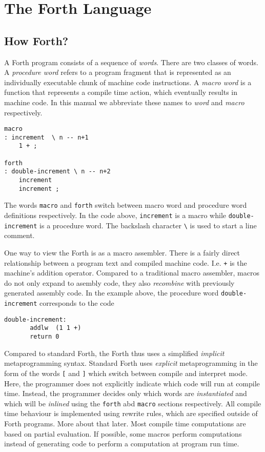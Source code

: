 \documentclass[12pt]{article}
\begin{document}
\section{The Forth Language}

\subsection{How Forth?}

A Forth program consists of a sequence of \emph{words}. There are two
classes of words. A \emph{procedure word} refers to a program fragment
that is represented as an individually executable chunk of machine
code instructions. A \emph{macro word} is a function that represents a
compile time action, which eventually results in machine code. In this
manual we abbreviate these names to \emph{word} and \emph{macro}
respectively.
\begin{verbatim}
macro
: increment  \ n -- n+1
    1 + ;

forth
: double-increment \ n -- n+2
    increment
    increment ;
\end{verbatim}
The words \verb|macro| and \verb|forth| switch between macro word and
procedure word definitions respectively. In the code above,
\verb|increment| is a macro while \verb|double-increment| is a
procedure word. The backslash character \verb|\| is used to start a
line comment.

One way to view the Forth is as a macro assembler.  There is a fairly
direct relationship between a program text and compiled machine
code. I.e. \verb|+| is the machine's addition operator. Compared to a
traditional macro assembler, macros do not only expand to asembly
code, they also \emph{recombine} with previously generated assembly
code.  In the example above, the procedure word
\verb"double-increment" corresponds to the code
\begin{verbatim}
double-increment:
       addlw  (1 1 +)
       return 0
\end{verbatim}

Compared to standard Forth, the Forth thus uses a simplified
\emph{implicit} metaprogramming syntax.  Standard Forth uses
\emph{explicit} metaprogramming in the form of the words \verb|[| and
\verb|]| which switch between compile and interpret mode.  Here, the
programmer does not explicitly indicate which code will run at compile
time. Instead, the programmer decides only which words are
\emph{instantiated} and which will be \emph{inlined} using the
\verb|forth| abd \verb|macro| sections respectively. All compile time
behaviour is implemented using rewrite rules, which are specified
outside of Forth programs. More about that later. Most compile time
computations are based on partial evaluation. If possible, some macros
perform computations instead of generating code to perform a
computation at program run time.
\end{document}
